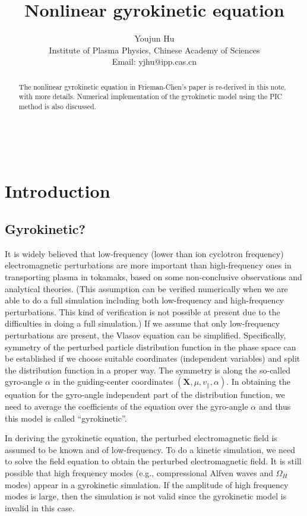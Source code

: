 \documentclass{article}
\newcommand{\tmaffiliation}[1]{\\ #1}
\begin{document}
\

\title{Nonlinear gyrokinetic equation}

\author{
  Youjun Hu
  \tmaffiliation{Institute of Plasma Physics, Chinese Academy of Sciences\\
  Email: yjhu@ipp.cas.cn}
}

\maketitle

\begin{abstract}
  The nonlinear gyrokinetic equation in Frieman-Chen's
  paper{\cite{frieman1982}} is re-derived in this note, with more details.
  Numerical implementation of the gyrokinetic model using the PIC method is
  also discussed.
\end{abstract}

\section{Introduction}

\subsection{Gyrokinetic?}

It is widely believed that low-frequency (lower than ion cyclotron frequency)
electromagnetic perturbations are more important than high-frequency ones in
transporting plasma in tokamaks, based on some non-conclusive observations and
analytical theories. (This assumption can be verified numerically when we are
able to do a full simulation including both low-frequency and high-frequency
perturbations. This kind of verification is not possible at present due to the
difficulties in doing a full simulation.) If we assume that only low-frequency
perturbations are present, the Vlasov equation can be simplified.
Specifically, symmetry of the perturbed particle distribution function in the
phase space can be established if we choose suitable coordinates (independent
variables) and split the distribution function in a proper way. The symmetry
is along the so-called gyro-angle $\alpha$ in the guiding-center coordinates
$(\mathbf{X}, \mu, v_{\parallel}, \alpha)$. In obtaining the equation for the
gyro-angle independent part of the distribution function, we need to average
the coefficients of the equation over the gyro-angle $\alpha$ and thus this
model is called ``gyrokinetic''.

In deriving the gyrokinetic equation, the perturbed electromagnetic field is
assumed to be known and of low-frequency. To do a kinetic simulation, we need
to solve the field equation to obtain the perturbed electromagnetic field. It
is still possible that high frequency modes (e.g., compressional Alfven waves
and $\Omega_H$ modes) appear in a gyrokinetic simulation. If the amplitude of
high frequency modes is large, then the simulation is not valid since the
gyrokinetic model is invalid in this case.
\end{document}
